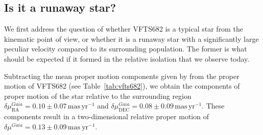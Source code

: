 \documentclass[apjl,twocolumn]{emulateapj}
\newcommand{\masyr}{\,\mathrm{mas}\,\mathrm{yr}^{-1}}
\DeclareRobustCommand{\Figref}[1]{Fig.~\ref{#1}}
\DeclareRobustCommand{\Tabref}[1]{Table~\ref{#1}}
\DeclareRobustCommand{\Secref}[1]{Sec.~\ref{#1}}
\begin{document}
\subsection{Is it a runaway star?}
\label{sec:runaway}
We first address the question of whether VFTS682 is a typical star
from the kinematic point of view, or whether it is a runaway star with
a significantly large peculiar velocity compared to its surrounding population. The former is what should
be expected if it formed in the relative isolation that we observe today.%

Subtracting the mean proper motion components given by
\citet{lennon:18} from the
proper motion of VFTS682 (see \Tabref{tab:vfts682}), we obtain the
components of proper motion of the star relative to the surrounding region
$\delta\mu_\mathrm{RA}^{Gaia} = 0.10 \pm 0.07\masyr$
and $\delta\mu_\mathrm{DEC}^{Gaia} = 0.08
\pm 0.09\masyr$. These components result in a
two-dimensional relative proper motion of $\delta \mu^{Gaia}=0.13\pm 0.09\,\mathrm{mas\
  yr^{-1}}$.


\end{document}
